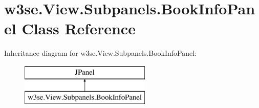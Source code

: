 \hypertarget{classw3se_1_1_view_1_1_subpanels_1_1_book_info_panel}{\section{w3se.\-View.\-Subpanels.\-Book\-Info\-Panel Class Reference}
\label{classw3se_1_1_view_1_1_subpanels_1_1_book_info_panel}
}
Inheritance diagram for w3se.\-View.\-Subpanels.\-Book\-Info\-Panel\-:\begin{figure}[H]
\begin{center}
\leavevmode
\includegraphics[height=2.000000cm]{classw3se_1_1_view_1_1_subpanels_1_1_book_info_panel}
\end{center}
\end{figure}
